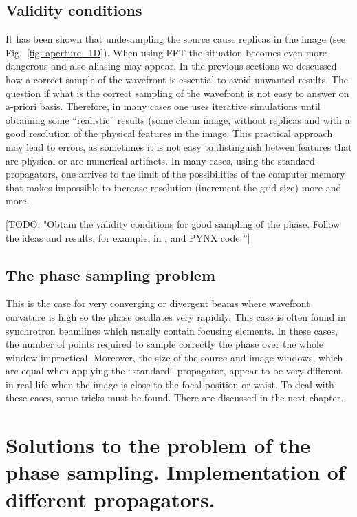 \documentclass{iucr}              %
\newcommand{\todo}[1]{{\color{red}[TODO: "#1'']}}
\begin{document}
\subsection{Validity conditions}

It has been shown that undesampling the source cause replicas in the image (see Fig.~\ref{fig: aperture_1D}). When using FFT the situation becomes even more dangerous and also aliasing may appear. In the previous sections we descussed how a correct sample of the wavefront is essential to avoid unwanted results. The question if what is the correct sampling of the wavefront is not easy to answer on a-priori basis. Therefore, in many cases one uses iterative simulations until obtaining some ``realistic'' results (some cleam image, without replicas and with a good resolution of the physical features in the image. This practical approach may lead to errors, as sometimes it is not easy to distinguish betwen features that are physical or are numerical artifacts. In many cases, using the standard propagators, one arrives to the limit of the possibilities of the computer memory that makes impossible to increase resolution (increment the grid size) more and more.

\todo{Obtain the validity conditions for good sampling of the phase. Follow the ideas and results, for example, in \cite{schmidt}, \cite{pirro} and PYNX code }  



\subsection{The phase sampling problem}




 This is the case for very converging or divergent beams where wavefront curvature is high so the phase oscillates very rapidily. This case is often found in synchrotron beamlines which usually contain focusing elements. In these cases, the number of points required to sample correctly the phase over the whole window impractical. Moreover, the size of the source and image windows, which are equal when applying the ``standard'' propagator, appear to be very different in real life when the image is close to the focal position or waist. To deal with these cases, some tricks must be found. There are discussed in the next chapter.


\section{Solutions to the problem of the phase sampling. Implementation of different propagators.}
\label{ch: spherical fronts}
\end{document}
